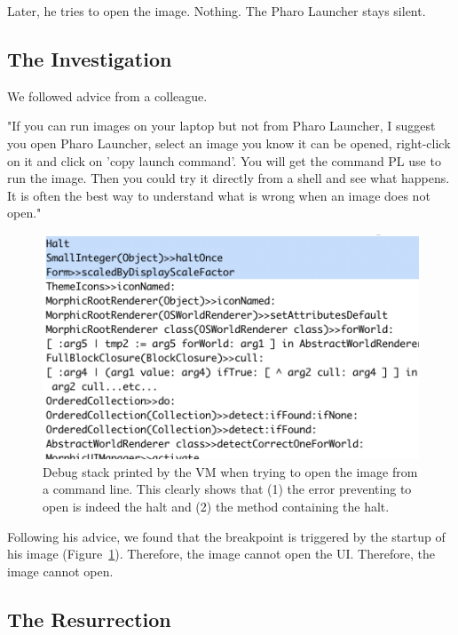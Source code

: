 \documentclass{article}
\begin{document}
\noindent Later, he tries to open the image.\newline
Nothing.\newline
The Pharo Launcher stays silent.\newline

\subsection{The Investigation}

We followed advice from a colleague.

"If you can run images on your laptop but not from Pharo Launcher, I suggest you open Pharo Launcher, select an image you know it can be opened, right-click on it and click on 'copy launch command'. 
You will get the command PL use to run the image. 
Then you could try it directly from a shell and see what happens. 
It is often the best way to understand what is wrong when an image does not open."


\begin{figure}[ht]
    \centering
    \includegraphics[width=0.7\linewidth]{debugStack}
    \caption{
    Debug stack printed by the VM when trying to open the image from a command line.
    This clearly shows that (1) the error preventing to open is indeed the halt and (2) the method containing the halt.
    }%
    \label{fig:debugStack}
\end{figure}

\noindent Following his advice, we found that the breakpoint is triggered by the startup of his image (Figure~\ref{fig:debugStack}).\newline
\noindent Therefore, the image cannot open the UI.\newline
\noindent Therefore, the image cannot open.\newline

\subsection{The Resurrection}
\end{document}
